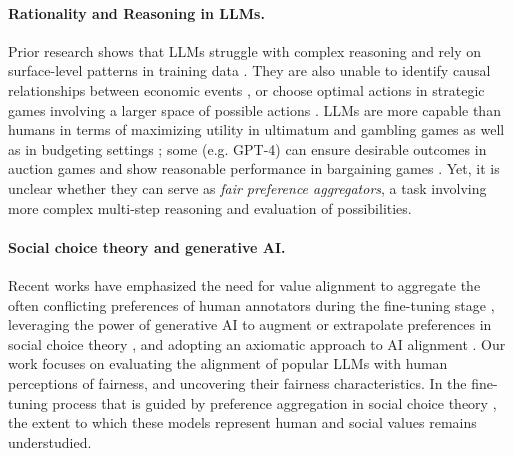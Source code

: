 \paragraph{Rationality and Reasoning in LLMs.} Prior research shows that LLMs struggle with complex reasoning \citep{Chang2024Survey,hadi2023survey} and rely on surface-level patterns in training data \citep{Dziri2023Faith,mondorf2024beyond}. They are also unable to identify causal relationships between economic events \citep{guo2024econnli,quan2024econlogicqa}, 
or choose optimal actions in strategic games involving a larger space of possible actions \citep{gandhi2023strategic}. %
LLMs are more capable than humans in terms of maximizing utility in ultimatum and gambling games \citep{ross2024llm} as well as in budgeting settings \citep{ChenRevealedPreference2023}; some  (e.g. GPT-4) can ensure desirable outcomes in auction games \citep{chen2023put} and show reasonable performance in bargaining games \citep{hua2024game}. 
Yet, it is unclear whether they can serve as \textit{fair preference aggregators}, a task involving more complex multi-step reasoning and evaluation of possibilities. %


\paragraph{Social choice theory and generative AI.} 
Recent works have emphasized the need for value alignment to aggregate the often conflicting preferences of human annotators during the fine-tuning stage \citep{conitzer2024social}, leveraging the power of generative AI to augment or extrapolate preferences in social choice theory \citep{fish2024generative}, and adopting an axiomatic approach to AI alignment \citep{ge2024axioms}.
Our work focuses on evaluating the alignment of popular LLMs with human perceptions of fairness, and uncovering their fairness characteristics.
In the fine-tuning process that is guided by preference aggregation in social choice theory \cite{conitzer2024social,fish2024generative}, the extent to which these models represent human and social values remains understudied.